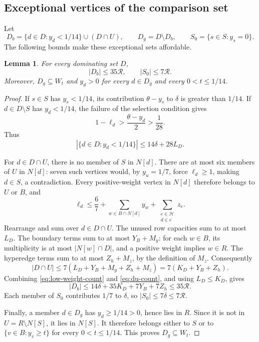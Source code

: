 \documentclass[11pt,a4paper]{article}
\newtheorem{lemma}[lemma]{Lemma}
\theoremstyle{definition}
\theoremstyle{remark}
\newcommand{\HH}{\mathcal H}
\newcommand{\budget}{\mathcal R}
\begin{document}
\subsection{Exceptional vertices of the comparison set}

Let
\begin{equation}\label{eq:bad-good}
 D_b=\{d\in D:y_d<1/14\}\cup(D\cap U),\qquad
 D_g=D\setminus D_b,\qquad
 S_0=\{s\in S:y_s=0\}.
\end{equation}
The following bounds make these exceptional sets affordable.

\begin{lemma}\label{lem:bad-counts}
For every dominating set \(D\),
\begin{equation}\label{eq:bad-counts}
 |D_b|\leq35\budget,\qquad |S_0|\leq7\budget .
\end{equation}
Moreover, \(D_g\subseteq W_t\) and \(y_d>0\) for every \(d\in D_g\)
and every \(0<t\leq1/14\).
\end{lemma}
\begin{proof}
If \(s\in S\) has \(y_s<1/14\), its contribution
\(\theta-y_s\) to \(\delta\) is greater than \(1/14\).
If \(d\in D\setminus S\) has \(y_d<1/14\), the failure of the
selection condition gives
\[
 1-\ell_d>\frac{\theta-y_d}{2}>\frac1{28}.
\]
Thus
\begin{equation}\label{eq:low-weight-count}
 |\{d\in D:y_d<1/14\}|\leq14\delta+28L_D.
\end{equation}

For \(d\in D\cap U\), there is no member of \(S\) in \(N[d]\).
There are at most six members of \(U\) in \(N[d]\): seven such
vertices would, by \(y_u=1/7\), force \(\ell_d\geq1\), making
\(d\in S\), a contradiction. Every positive-weight vertex in
\(N[d]\) therefore belongs to \(U\) or \(B\), and
\[
 \ell_d
 \leq\frac67+\sum_{w\in B\cap N[d]}y_w
              +\sum_{\substack{e\in\HH\\d\in e}}z_e.
\]
Rearrange and sum over \(d\in D\cap U\).
The unused row capacities sum to at most \(L_D\).
The boundary terms sum to at most \(Y_B+M_y\): for each \(w\in B\),
its multiplicity is at most \(|N[w]\cap D|\), and a positive
weight implies \(w\in R\). The hyperedge terms sum to at most
\(Z_h+M_z\), by the definition of \(M_z\).
Consequently
\begin{equation}\label{eq:du-count}
 |D\cap U|\leq7(L_D+Y_B+M_y+Z_h+M_z)
             =7(K_D+Y_B+Z_h).
\end{equation}
Combining \eqref{eq:low-weight-count} and \eqref{eq:du-count}, and
using \(L_D\leq K_D\), gives
\[
 |D_b|\leq14\delta+35K_D+7Y_B+7Z_h\leq35\budget.
\]
Each member of \(S_0\) contributes \(1/7\) to \(\delta\), so
\(|S_0|\leq7\delta\leq7\budget\).

Finally, a member \(d\in D_g\) has \(y_d\geq1/14>0\), hence lies
in \(R\). Since it is not in \(U=R\setminus N[S]\), it lies in
\(N[S]\). It therefore belongs either to \(S\) or to
\(\{v\in B:y_v\geq t\}\) for every \(0<t\leq1/14\).
This proves \(D_g\subseteq W_t\).
\end{proof}
\end{document}
